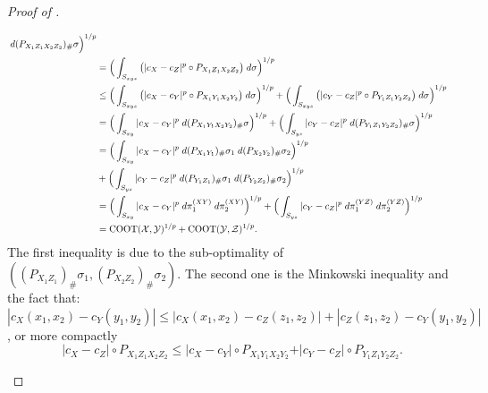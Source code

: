 \begin{proof}[Proof of ]
\begin{enumerate}
\begin{equation}
\begin{split}
        \; d(P_{X_1 Z_1 X_2 Z_2})_{\#} \sigma \Big)^{1/p} \\
        &= \Big( \int_{S_{xyz}} \big( \vert c_X - c_Z \vert^p \circ P_{X_1 Z_1 X_2 Z_2} \big)
        \; d \sigma \Big)^{1/p} \\
        &\leq \Big( \int_{S_{xyz}} \big( \vert c_X - c_Y \vert^p \circ P_{X_1 Y_1 X_2 Y_2} \big)
        \; d \sigma \Big)^{1/p} +
        \Big( \int_{S_{xyz}} \big( \vert c_Y - c_Z \vert^p \circ P_{Y_1 Z_1 Y_2 Z_2} \big)
        \; d \sigma \Big)^{1/p} \\
        &= \Big( \int_{S_{xy}} \vert c_X - c_Y \vert^p
        \; d (P_{X_1 Y_1 X_2 Y_2})_{\#} \sigma \Big)^{1/p}  +
        \Big( \int_{S_{yz}} \vert c_Y - c_Z \vert^p
        \; d (P_{Y_1 Z_1 Y_2 Z_2})_{\#} \sigma \Big)^{1/p}  \\
        &= \Big( \int_{S_{xy}} \vert c_X - c_Y \vert^p
        \; d (P_{X_1 Y_1})_{\#} \sigma_1 \; d (P_{X_2 Y_2})_{\#} \sigma_2 \Big)^{1/p} \\
        &+ \Big( \int_{S_{yz}} \vert c_Y - c_Z \vert^p
        \; d (P_{Y_1 Z_1})_{\#} \sigma_1 \; d (P_{Y_2 Z_2})_{\#} \sigma_2 \Big)^{1/p} \\
        &= \Big( \int_{S_{xy}} \vert c_X - c_Y \vert^p \; d \pi^{(XY)}_1 \; d \pi^{(XY)}_2 \Big)^{1/p}  +
        \Big( \int_{S_{yz}} \vert c_Y - c_Z \vert^p \; d \pi^{(YZ)}_1 \; d \pi^{(YZ)}_2 \Big)^{1/p} \\
        &= \text{COOT}(\mathcal X, \mathcal Y)^{1/p} + \text{COOT}(\mathcal Y, \mathcal Z)^{1/p}.
      \end{split}
    \end{equation}
    The first inequality is due to the sub-optimality of
    $((P_{X_1 Z_1})_{\#} \sigma_1, (P_{X_2 Z_2})_{\#} \sigma_2)$. The second one is
    the Minkowski inequality and the fact that:
    $|c_X(x_1,x_2) - c_Y(y_1,y_2)| \leq |c_X(x_1,x_2) - c_Z(z_1,z_2)| + |c_Z(z_1,z_2) - c_Y(y_1,y_2)|$,
    or more compactly
    \begin{equation}
      \vert c_X - c_Z \vert \circ P_{X_1 Z_1 X_2 Z_2} \leq
      \vert c_X - c_Y \vert \circ P_{X_1 Y_1 X_2 Y_2} +
      \vert c_Y - c_Z \vert \circ P_{Y_1 Z_1 Y_2 Z_2}.
    \end{equation}
  \end{enumerate}
\end{proof}

